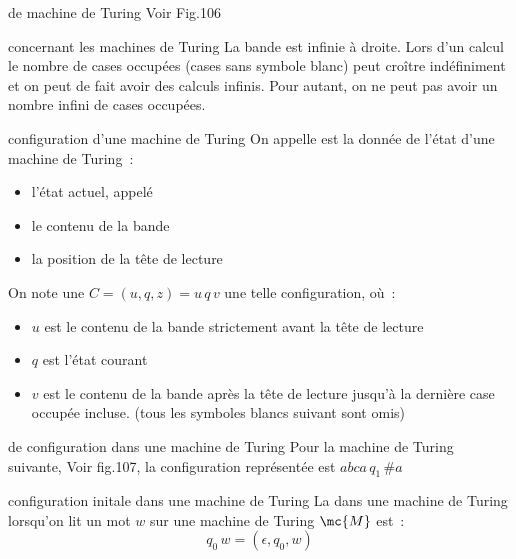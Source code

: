\begin{exemple}{}{de machine de Turing}
    Voir Fig.106
    
\end{exemple}

\begin{remarque}{}{concernant les machines de Turing}
    La bande est infinie à droite. Lors d'un calcul le nombre de cases occupées (cases sans symbole blanc) peut croître indéfiniment et on peut de fait avoir des calculs infinis. Pour autant, on ne peut pas avoir un nombre infini de cases occupées.
\end{remarque}

\begin{definition}{}{configuration d'une machine de Turing}
    On appelle  est la donnée de l'état d'une machine de Turing~:
    \begin{itemize}
        \item l'état actuel, appelé 
        \item le contenu de la bande
        \item la position de la tête de lecture
    \end{itemize}
    On note une $C = (u,q,z) = u\,q\,v$ une telle configuration, où~:
    \begin{itemize}
        \item $u$ est le contenu de la bande strictement avant la tête de lecture
        \item $q$ est l'état courant
        \item $v$ est le contenu de la bande après la tête de lecture jusqu'à la dernière case occupée incluse. (tous les symboles blancs suivant sont omis)
    \end{itemize}
\end{definition}

\begin{exemple}{}{de configuration dans une machine de Turing}
    Pour la machine de Turing suivante, Voir fig.107, la configuration représentée est $abca \, q_1 \, \#a $
\end{exemple}

\begin{definition}{}{configuration initale dans une machine de Turing}
    La  dans une machine de Turing lorsqu'on lit un mot $w$ sur une machine de Turing $\mc{M}$ est~:
    $$q_0\, w = (\epsilon, q_0, w)$$
\end{definition}

